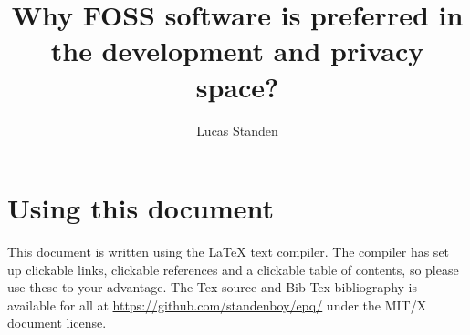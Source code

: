 \documentclass[a4paper,12pt]{article}
\author{Lucas Standen} \title{Why FOSS software is preferred in the development and privacy space?}
\begin{document}
 \maketitle

\newpage

\section{Using this document} This document is written using the {\LaTeX} text compiler. The compiler has set up
clickable links, clickable references and a clickable table of contents, so please use these to your advantage.
The Tex source and Bib Tex bibliography is available for all at \url{https://github.com/standenboy/epq/} under
the MIT/X document license.

\tableofcontents \newpage

\setlength{\parskip}{1em}
\end{document}
